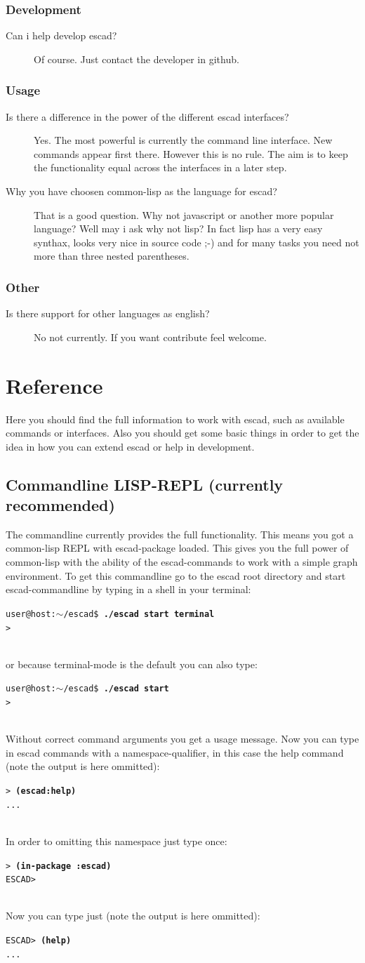 \documentclass[a4paper, 12pt, openany]{scrbook}
\makeatletter
\newcommand{\shellcmdline}[2]{\\
  \setlength{\fboxsep}{2pt}\colorbox{black!20}{\parbox{\textwidth}{\texttt{user@host:$\sim$/escad\$ \textbf{#1}\\#2}}}\\}
\newcommand{\escadcmdline}[2]{\\\setlength{\fboxsep}{2pt}\colorbox{black!20}{\parbox{\textwidth}{\texttt{ESCAD> \textbf{#1}\\#2}}}\\}
\newcommand{\lispcmdline}[2]{\\\setlength{\fboxsep}{2pt}\colorbox{black!20}{\parbox{\textwidth}{\texttt{> \textbf{#1}\\#2}}}\\}
\makeatother
\begin{document}
\subsection{Development}
\begin{description}
\item[Can i help develop escad?] Of course. Just contact the developer in github.
\end{description}
\subsection{Usage}
\begin{description}
\item[Is there a difference in the power of the different escad interfaces?] Yes. The most powerful is currently the command line interface. New commands appear first there. However this is no rule. The aim is to keep the functionality equal across the interfaces in a later step.
\item[Why you have choosen common-lisp as the language for escad?] That is a good question. Why not javascript or another more popular language? Well may i ask why not lisp? In fact lisp has a very easy synthax, looks very nice in source code ;-) and for many tasks you need not more than three nested parentheses.
\end{description}
\subsection{Other}
\begin{description}
\item[Is there support for other languages as english?]  No not currently. If you want contribute feel welcome.
\end{description}
\chapter{Reference}
Here you should find the full information to work with escad, such as available commands or interfaces. Also you should get some basic things in order to get the idea in how you can extend escad or help in development.
\section{Commandline LISP-REPL (currently recommended)}\label{sec:cmd_line}
The commandline currently provides the full functionality. This means you got a common-lisp REPL with escad-package loaded. This gives you the full power of common-lisp with the ability of the escad-commands to work with a simple graph environment. To get this commandline go to the escad root directory and start escad-commandline by typing in a shell in your terminal:
\shellcmdline{./escad start terminal}{>}
or because terminal-mode is the default you can also type:
\shellcmdline{./escad start}{>}
Without correct command arguments you get a usage message.
Now you can type in escad commands with a namespace-qualifier, in this case the help command (note the output is here ommitted):
\lispcmdline{(escad:help)}{...}
In order to omitting this namespace just type once:
\lispcmdline{(in-package :escad)}{ESCAD>}
Now you can type just (note the output is here ommitted):
\escadcmdline{(help)}{...}
\end{document}
